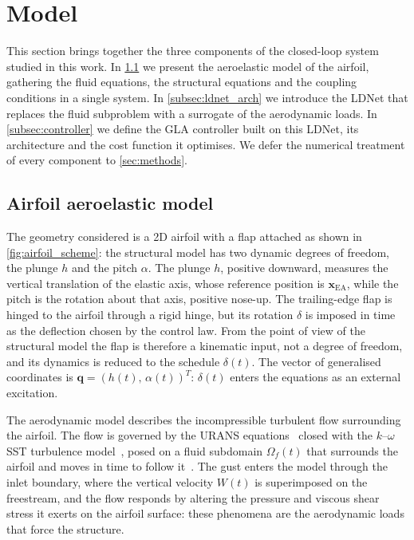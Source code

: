 \section{Model}
\label{sec:model}
\label{sec:aeroelastic model}

This section brings together the three components of the closed-loop system studied in this work. In \cref{subsec:aeroelastic_airfoil} we present the aeroelastic model of the airfoil, gathering the fluid equations, the structural equations and the coupling conditions in a single system. In \cref{subsec:ldnet_arch} we introduce the LDNet that replaces the fluid subproblem with a surrogate of the aerodynamic loads. In \cref{subsec:controller} we define the GLA controller built on this LDNet, its architecture and the cost function it optimises. We defer the numerical treatment of every component to \cref{sec:methods}.

\subsection{Airfoil aeroelastic model}
\label{subsec:aeroelastic_airfoil}
\label{subsec:structmodel}
\label{subsec:fluid_eqs}

The geometry considered is a 2D airfoil with a flap attached as shown in \cref{fig:airfoil_scheme}: the structural model has two dynamic degrees of freedom, the plunge $h$ and the pitch $\alpha$. The plunge $h$, positive downward, measures the vertical translation of the elastic axis, whose reference position is $\mathbf{x}_{\mathrm{EA}}$, while the pitch is the rotation about that axis, positive nose-up. The trailing-edge flap is hinged to the airfoil through a rigid hinge, but its rotation $\delta$ is imposed in time as the deflection chosen by the control law. From the point of view of the structural model the flap is therefore a kinematic input, not a degree of freedom, and its dynamics is reduced to the schedule $\delta(t)$. The vector of generalised coordinates is $\mathbf{q} = (h(t),\,\alpha(t))^{T}$: $\delta(t)$ enters the equations as an external excitation.



The aerodynamic model describes the incompressible turbulent flow surrounding the airfoil. The flow is governed by the URANS equations~\cite{wilcox2006turbulence} closed with the $k$--$\omega$ SST turbulence model~\cite{menter1994sst}, posed on a fluid subdomain $\Omega_f(t)$ that surrounds the airfoil and moves in time to follow it~\cite{Donea2004ALE}. The gust enters the model through the inlet boundary, where the vertical velocity $W(t)$ is superimposed on the freestream, and the flow responds by altering the pressure and viscous shear stress it exerts on the airfoil surface: these phenomena are the aerodynamic loads that force the structure.

